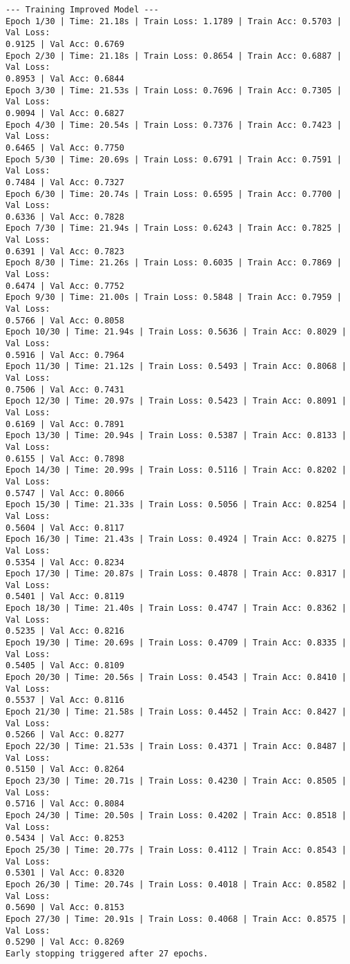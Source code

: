 \documentclass[11pt]{article}
\begin{document}
\begin{Verbatim}[commandchars=\\\{\}]
--- Training Improved Model ---
Epoch 1/30 | Time: 21.18s | Train Loss: 1.1789 | Train Acc: 0.5703 | Val Loss:
0.9125 | Val Acc: 0.6769
Epoch 2/30 | Time: 21.18s | Train Loss: 0.8654 | Train Acc: 0.6887 | Val Loss:
0.8953 | Val Acc: 0.6844
Epoch 3/30 | Time: 21.53s | Train Loss: 0.7696 | Train Acc: 0.7305 | Val Loss:
0.9094 | Val Acc: 0.6827
Epoch 4/30 | Time: 20.54s | Train Loss: 0.7376 | Train Acc: 0.7423 | Val Loss:
0.6465 | Val Acc: 0.7750
Epoch 5/30 | Time: 20.69s | Train Loss: 0.6791 | Train Acc: 0.7591 | Val Loss:
0.7484 | Val Acc: 0.7327
Epoch 6/30 | Time: 20.74s | Train Loss: 0.6595 | Train Acc: 0.7700 | Val Loss:
0.6336 | Val Acc: 0.7828
Epoch 7/30 | Time: 21.94s | Train Loss: 0.6243 | Train Acc: 0.7825 | Val Loss:
0.6391 | Val Acc: 0.7823
Epoch 8/30 | Time: 21.26s | Train Loss: 0.6035 | Train Acc: 0.7869 | Val Loss:
0.6474 | Val Acc: 0.7752
Epoch 9/30 | Time: 21.00s | Train Loss: 0.5848 | Train Acc: 0.7959 | Val Loss:
0.5766 | Val Acc: 0.8058
Epoch 10/30 | Time: 21.94s | Train Loss: 0.5636 | Train Acc: 0.8029 | Val Loss:
0.5916 | Val Acc: 0.7964
Epoch 11/30 | Time: 21.12s | Train Loss: 0.5493 | Train Acc: 0.8068 | Val Loss:
0.7506 | Val Acc: 0.7431
Epoch 12/30 | Time: 20.97s | Train Loss: 0.5423 | Train Acc: 0.8091 | Val Loss:
0.6169 | Val Acc: 0.7891
Epoch 13/30 | Time: 20.94s | Train Loss: 0.5387 | Train Acc: 0.8133 | Val Loss:
0.6155 | Val Acc: 0.7898
Epoch 14/30 | Time: 20.99s | Train Loss: 0.5116 | Train Acc: 0.8202 | Val Loss:
0.5747 | Val Acc: 0.8066
Epoch 15/30 | Time: 21.33s | Train Loss: 0.5056 | Train Acc: 0.8254 | Val Loss:
0.5604 | Val Acc: 0.8117
Epoch 16/30 | Time: 21.43s | Train Loss: 0.4924 | Train Acc: 0.8275 | Val Loss:
0.5354 | Val Acc: 0.8234
Epoch 17/30 | Time: 20.87s | Train Loss: 0.4878 | Train Acc: 0.8317 | Val Loss:
0.5401 | Val Acc: 0.8119
Epoch 18/30 | Time: 21.40s | Train Loss: 0.4747 | Train Acc: 0.8362 | Val Loss:
0.5235 | Val Acc: 0.8216
Epoch 19/30 | Time: 20.69s | Train Loss: 0.4709 | Train Acc: 0.8335 | Val Loss:
0.5405 | Val Acc: 0.8109
Epoch 20/30 | Time: 20.56s | Train Loss: 0.4543 | Train Acc: 0.8410 | Val Loss:
0.5537 | Val Acc: 0.8116
Epoch 21/30 | Time: 21.58s | Train Loss: 0.4452 | Train Acc: 0.8427 | Val Loss:
0.5266 | Val Acc: 0.8277
Epoch 22/30 | Time: 21.53s | Train Loss: 0.4371 | Train Acc: 0.8487 | Val Loss:
0.5150 | Val Acc: 0.8264
Epoch 23/30 | Time: 20.71s | Train Loss: 0.4230 | Train Acc: 0.8505 | Val Loss:
0.5716 | Val Acc: 0.8084
Epoch 24/30 | Time: 20.50s | Train Loss: 0.4202 | Train Acc: 0.8518 | Val Loss:
0.5434 | Val Acc: 0.8253
Epoch 25/30 | Time: 20.77s | Train Loss: 0.4112 | Train Acc: 0.8543 | Val Loss:
0.5301 | Val Acc: 0.8320
Epoch 26/30 | Time: 20.74s | Train Loss: 0.4018 | Train Acc: 0.8582 | Val Loss:
0.5690 | Val Acc: 0.8153
Epoch 27/30 | Time: 20.91s | Train Loss: 0.4068 | Train Acc: 0.8575 | Val Loss:
0.5290 | Val Acc: 0.8269
Early stopping triggered after 27 epochs.
    \end{Verbatim}
\end{document}
